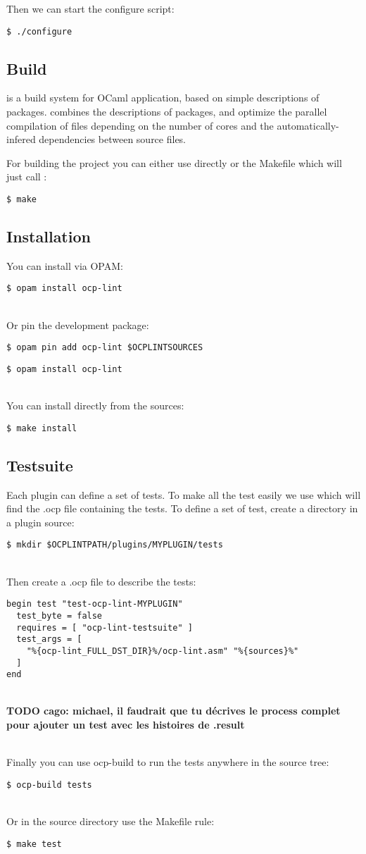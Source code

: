 Then we can start the configure script:

{\tt \$ ./configure}


\subsection{Build}
\ocpbuild is a build system for OCaml application, based on simple descriptions
of packages. \ocpbuild combines the descriptions of packages, and optimize the
parallel compilation of files depending on the number of cores and the
automatically-infered dependencies between source files.

For building the project you can either use directly \ocpbuild or the Makefile
which will just call \ocpbuild:

{\tt \$ make} 

\subsection{Installation}
You can install \ocplint{} via OPAM:

{\tt \$ opam install ocp-lint}

~\\
Or pin the development package:

{\tt \$ opam pin add ocp-lint \$OCPLINTSOURCES}

{\tt \$ opam install ocp-lint}

~\\
You can install \ocplint{} directly from the sources:

{\tt \$ make install}

\subsection{Testsuite}
Each plugin can define a set of tests. To make all the test easily we use
\ocpbuild which will find the .ocp file containing the tests.
To define a set of test, create a directory in a plugin source:

{\tt \$ mkdir \$OCPLINTPATH/plugins/MYPLUGIN/tests}

~\\
Then create a .ocp file to describe the tests:

\begin{lstlisting}
begin test "test-ocp-lint-MYPLUGIN"
  test_byte = false
  requires = [ "ocp-lint-testsuite" ]
  test_args = [
    "%{ocp-lint_FULL_DST_DIR}%/ocp-lint.asm" "%{sources}%"
  ]
end
\end{lstlisting}

~\\

{\bf TODO cago: michael, il faudrait que tu décrives le process complet pour
  ajouter un test avec les histoires de .result}

~\\
Finally you can use ocp-build to run the tests anywhere in the source tree:

{\tt \$ ocp-build tests}

~\\
Or in the source directory use the Makefile rule:

{\tt \$ make test}
